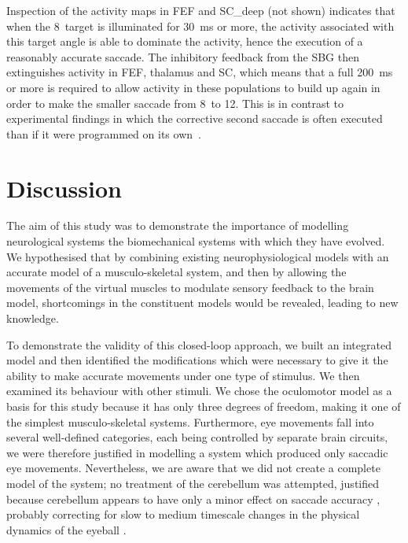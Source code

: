 \documentclass{frontiersSCNS}
\begin{document}
Inspection of the activity maps in FEF and SC\_deep (not shown)
indicates that when the 8\dg~target is illuminated for 30~ms or more,
the activity associated with this target angle is able to dominate the
activity, hence the execution of a reasonably accurate saccade. The
inhibitory feedback from the SBG then extinguishes activity in FEF,
thalamus and SC, which means that a full 200~ms or more is required to
allow activity in these populations to build up again in order to make
the smaller saccade from 8\dg~to 12\dg. This is in contrast to
experimental findings in which the corrective second saccade is often
executed  than if it were programmed on its
own~\citep{becker_analysis_1979}.


\section{Discussion} \label{sec:discussion}

The aim of this study was to demonstrate the importance of modelling
neurological systems  the biomechanical systems
with which they have evolved. We hypothesised that by
combining existing neurophysiological models with an accurate model of
a musculo-skeletal system, and then  by allowing the
movements of the virtual muscles to modulate sensory feedback to the
brain model, shortcomings in the constituent models would be revealed,
leading to new knowledge.

To demonstrate the validity of this closed-loop
approach, we built an integrated model and then identified the
modifications which were necessary to give it the ability to make
accurate movements under one type of stimulus. We then examined its
behaviour with other stimuli. We chose the oculomotor model as a basis
for this study because it has only three degrees of freedom, making it
one of the simplest musculo-skeletal systems. Furthermore, eye
movements fall into several well-defined categories, each being
controlled by separate brain circuits, we were therefore justified in
modelling a system which produced only saccadic eye
movements. Nevertheless, we are aware that we did not create a
complete model of the system; no treatment of the cerebellum was
attempted, justified because cerebellum appears to have only a minor
effect on saccade accuracy \citep{dean_adaptive_2008}, probably
correcting for slow to medium timescale changes in the physical
dynamics of the eyeball \citep{dean_learning_1994}.
\end{document}
